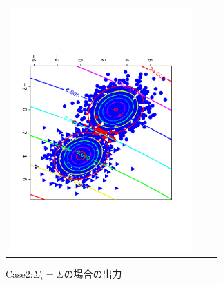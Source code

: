 \documentclass[uplatex,a4paper]{jsarticle}
\begin{document}
\begin{figure}[H]
\begin{center}
\begin{tabular}{ccc}
\begin{minipage}{0.33\hsize}
\end{minipage}
\begin{minipage}{0.33\hsize}
\includegraphics[width=7cm]{Model2_50.pdf}
\end{minipage}
\end{tabular}
\caption{Case2:$\Sigma_i=\Sigma$の場合の出力}
\label{fig:ass1_case2}
\end{center}
\end{figure}
\end{document}
